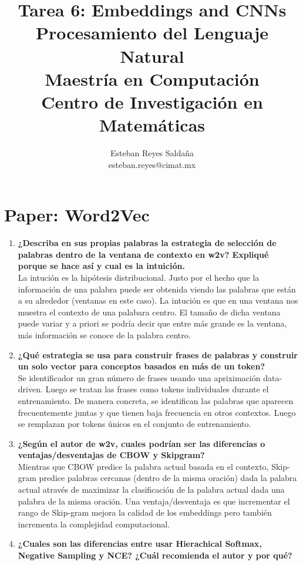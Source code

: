 \documentclass[11pt,letterpaper]{article}
\title{\textbf{Tarea 6: Embeddings and CNNs}\\ Procesamiento del Lenguaje Natural \\ \Large {Maestría en Computación}\\ \Large {Centro de Investigación en Matemáticas}}
\author{Esteban Reyes Saldaña \\ esteban.reyes@cimat.mx}
\theoremstyle{definition}
\theoremstyle{definition}
\theoremstyle{definition}
\begin{document}

\maketitle

\section{Paper: Word2Vec}
\begin{enumerate}
	\item \textbf{¿Describa en sus propias palabras la estrategia de selección de palabras dentro de la ventana de contexto en w2v? Expliqué porque se hace así y cual es la intuición.} 
	\\
	La intución es la hipótesis distribucional. Justo por el hecho que la información de una palabra puede ser obtenida viendo las palabras que están a su alrededor (ventanas en este caso). La intución es que en una ventana nos muestra el contexto de una palabara centro. El tamaño de dicha ventana puede variar y a priori se podría decir que entre más grande es la ventana, más información se conoce de la palabra centro. 
	\item \textbf{¿Qué estrategia se usa para construir frases de palabras y construir un solo vector para conceptos basados en más de un token?}	
	\\
	Se identificador un gran número de frases usando una apriximación data-driven. Luego se tratan las frases como tokens individuales durante el entrenamiento. De manera concreta, se identifican las palabras que aparecen frecuentemente juntas y que tienen baja frecuencia en otros contextos. Luego se remplazan por tokens únicos en el conjunto de entrenamiento.
	\item \textbf{¿Según el autor de w2v, cuales podrían ser las diferencias o ventajas/desventajas de CBOW y Skipgram?}
	\\
	Mientras que CBOW predice la palabra actual basada en el contexto, Skip-gram predice palabras cercanas (dentro de la misma oración) dada la palabra actual através de maximizar la clasificación de la palabra actual dada una palabra de la misma oración. Una ventaja/desventaja es que incrementar el rango de Skip-gram mejora la calidad de los embeddings pero también incrementa la complejidad computacional. 
	\item \textbf{¿Cuales son las diferencias entre usar Hierachical Softmax, Negative Sampling y NCE? ¿Cuál recomienda el autor y por qué?}
	\\

\end{enumerate}
\end{document}
